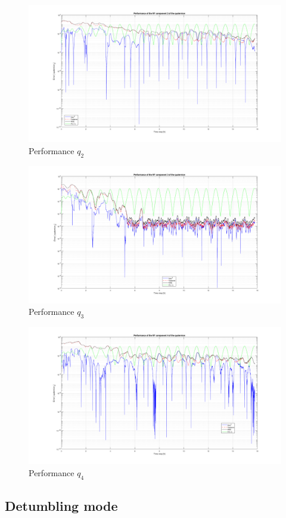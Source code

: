 \begin{itemize}
    \begin{figure}[H]
        \centering
        \includegraphics[width=\linewidth]{res/img/Nadir_EKF/EKF_performance/performance q2.png}
        \caption{Performance $q_2$}
        \label{fig:EKF_PerformanceQ2}
    \end{figure}

    \begin{figure}[H]
        \centering
        \includegraphics[width=\linewidth]{res/img/Nadir_EKF/EKF_performance/performance q3.png}
        \caption{Performance $q_3$}
        \label{fig:EKF_PerformanceQ3}
    \end{figure}

    \begin{figure}[H]
        \centering
        \includegraphics[width=\linewidth]{res/img/Nadir_EKF/EKF_performance/performance q4.png}
        \caption{Performance $q_4$}
        \label{fig:EKF_PerformanceQ4}
    \end{figure}
    

\end{itemize}

\subsection{Detumbling mode}